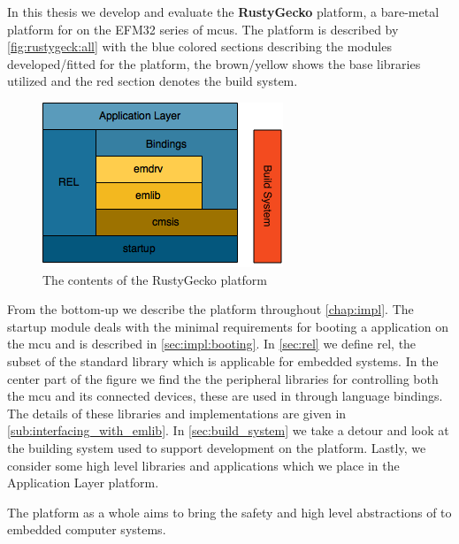 In this thesis we develop and evaluate the \textbf{RustyGecko} platform, a bare-metal platform for {\rust} on the EFM32 series of \glspl{mcu}.
The platform is described by \autoref{fig:rustygeck:all} with the blue colored sections describing the {\rust} modules developed/fitted for the platform, the brown/yellow shows the base {\C} libraries utilized and the red section denotes the build system.
\begin{figure}[H]
  \begin{center}
    \includegraphics{figures/RustyGecko-all.png}
  \end{center}
  \caption{The contents of the RustyGecko platform}
  \label{fig:rustygecko:all}
\end{figure}

From the bottom-up we describe the platform throughout \autoref{chap:impl}.
The startup module deals with the minimal requirements for booting a {\rust} application on the \gls{mcu} and is described in \autoref{sec:impl:booting}.
In \autoref{sec:rel} we define \gls{rel}, the subset of the standard library which is applicable for embedded systems.
In the center part of the figure we find the the peripheral libraries for controlling both the \gls{mcu} and its connected devices, these are used in {\rust} through language bindings.
The details of these libraries and implementations are given in \autoref{sub:interfacing_with_emlib}.
In \autoref{sec:build_system} we take a detour and look at the building system used to support development on the {\rg} platform.
Lastly, we consider some high level libraries and applications which we place in the Application Layer platform.

The {\rg} platform as a whole aims to bring the safety and high level abstractions of {\rust} to embedded computer systems.
